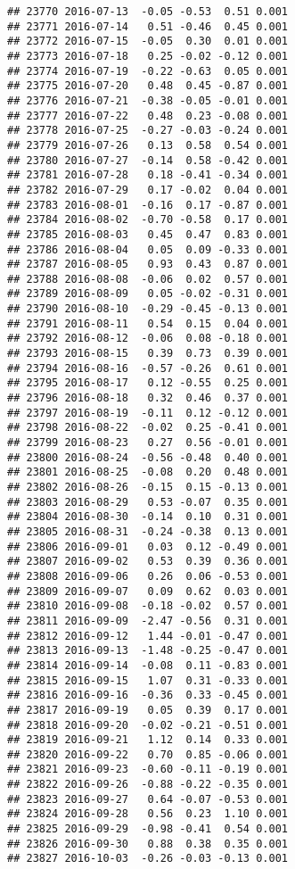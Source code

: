 \documentclass[
]{article}
\begin{document}
\begin{verbatim}
## 23770 2016-07-13  -0.05 -0.53  0.51 0.001
## 23771 2016-07-14   0.51 -0.46  0.45 0.001
## 23772 2016-07-15  -0.05  0.30  0.01 0.001
## 23773 2016-07-18   0.25 -0.02 -0.12 0.001
## 23774 2016-07-19  -0.22 -0.63  0.05 0.001
## 23775 2016-07-20   0.48  0.45 -0.87 0.001
## 23776 2016-07-21  -0.38 -0.05 -0.01 0.001
## 23777 2016-07-22   0.48  0.23 -0.08 0.001
## 23778 2016-07-25  -0.27 -0.03 -0.24 0.001
## 23779 2016-07-26   0.13  0.58  0.54 0.001
## 23780 2016-07-27  -0.14  0.58 -0.42 0.001
## 23781 2016-07-28   0.18 -0.41 -0.34 0.001
## 23782 2016-07-29   0.17 -0.02  0.04 0.001
## 23783 2016-08-01  -0.16  0.17 -0.87 0.001
## 23784 2016-08-02  -0.70 -0.58  0.17 0.001
## 23785 2016-08-03   0.45  0.47  0.83 0.001
## 23786 2016-08-04   0.05  0.09 -0.33 0.001
## 23787 2016-08-05   0.93  0.43  0.87 0.001
## 23788 2016-08-08  -0.06  0.02  0.57 0.001
## 23789 2016-08-09   0.05 -0.02 -0.31 0.001
## 23790 2016-08-10  -0.29 -0.45 -0.13 0.001
## 23791 2016-08-11   0.54  0.15  0.04 0.001
## 23792 2016-08-12  -0.06  0.08 -0.18 0.001
## 23793 2016-08-15   0.39  0.73  0.39 0.001
## 23794 2016-08-16  -0.57 -0.26  0.61 0.001
## 23795 2016-08-17   0.12 -0.55  0.25 0.001
## 23796 2016-08-18   0.32  0.46  0.37 0.001
## 23797 2016-08-19  -0.11  0.12 -0.12 0.001
## 23798 2016-08-22  -0.02  0.25 -0.41 0.001
## 23799 2016-08-23   0.27  0.56 -0.01 0.001
## 23800 2016-08-24  -0.56 -0.48  0.40 0.001
## 23801 2016-08-25  -0.08  0.20  0.48 0.001
## 23802 2016-08-26  -0.15  0.15 -0.13 0.001
## 23803 2016-08-29   0.53 -0.07  0.35 0.001
## 23804 2016-08-30  -0.14  0.10  0.31 0.001
## 23805 2016-08-31  -0.24 -0.38  0.13 0.001
## 23806 2016-09-01   0.03  0.12 -0.49 0.001
## 23807 2016-09-02   0.53  0.39  0.36 0.001
## 23808 2016-09-06   0.26  0.06 -0.53 0.001
## 23809 2016-09-07   0.09  0.62  0.03 0.001
## 23810 2016-09-08  -0.18 -0.02  0.57 0.001
## 23811 2016-09-09  -2.47 -0.56  0.31 0.001
## 23812 2016-09-12   1.44 -0.01 -0.47 0.001
## 23813 2016-09-13  -1.48 -0.25 -0.47 0.001
## 23814 2016-09-14  -0.08  0.11 -0.83 0.001
## 23815 2016-09-15   1.07  0.31 -0.33 0.001
## 23816 2016-09-16  -0.36  0.33 -0.45 0.001
## 23817 2016-09-19   0.05  0.39  0.17 0.001
## 23818 2016-09-20  -0.02 -0.21 -0.51 0.001
## 23819 2016-09-21   1.12  0.14  0.33 0.001
## 23820 2016-09-22   0.70  0.85 -0.06 0.001
## 23821 2016-09-23  -0.60 -0.11 -0.19 0.001
## 23822 2016-09-26  -0.88 -0.22 -0.35 0.001
## 23823 2016-09-27   0.64 -0.07 -0.53 0.001
## 23824 2016-09-28   0.56  0.23  1.10 0.001
## 23825 2016-09-29  -0.98 -0.41  0.54 0.001
## 23826 2016-09-30   0.88  0.38  0.35 0.001
## 23827 2016-10-03  -0.26 -0.03 -0.13 0.001

\end{verbatim}
\end{document}
